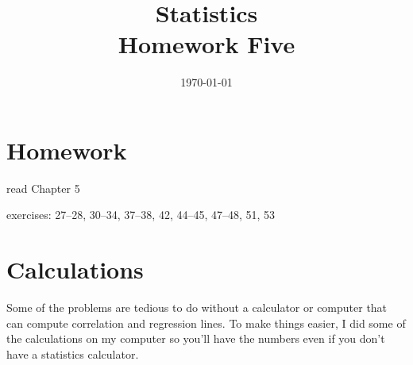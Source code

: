 \documentclass[letterpaper, landscape]{exam}
\title{Statistics \\ Homework Five}
\date{\today}
\author{}
\begin{document}
  \maketitle

  \section{Homework}
    \begin{itemize*}
      \item read Chapter 5 
      \item exercises: 27--28, 30--34, 37--38, 42, 44--45, 47--48, 51, 53
    \end{itemize*}

  \ifprintanswers{}
  \else
    \section{Calculations}

    Some of the problems are tedious to do without a calculator or computer that
    can compute correlation and regression lines.  To make things easier, I did
    some of the calculations on my computer so you'll have the numbers even if
    you don't have a statistics calculator.
\end{document}
